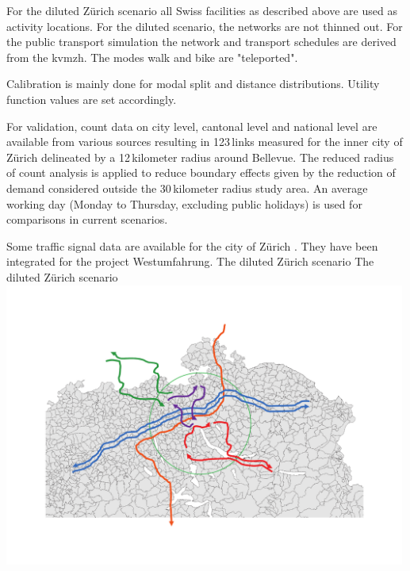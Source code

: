 For the diluted Zürich scenario all Swiss facilities as described above are used as activity locations. For the diluted scenario, the networks are not thinned out. For the public transport simulation the network and transport schedules are derived from the \gls{kvmzh}. The modes walk and bike are "teleported". 

Calibration is mainly done for modal split and distance distributions. Utility function values are set accordingly.

For validation, count data on city level, cantonal level and national level \citep[][]{ASTRA_Webpage_2006} are available from various sources resulting in 123\,links measured for the inner city of Zürich delineated by a 12\,kilometer radius around Bellevue. The reduced radius of count analysis is applied to reduce boundary effects given by the reduction of demand considered outside the 30\,kilometer radius study area. An average working day (Monday to Thursday, excluding public holidays) is used for comparisons in current scenarios.

Some traffic signal data are available for the city of Zürich \citep[][]{STAPOZH-DAV_unpub_gtZH_2008}. They have been integrated for the project Westumfahrung.
%
\createfigure%
{The diluted Zürich scenario}%
{The diluted Zürich scenario}%
{\label{fig:zurichScenario}}%
{\includegraphics[width=0.99\textwidth, angle=0]{using/figures/zh.pdf}}%
{}

